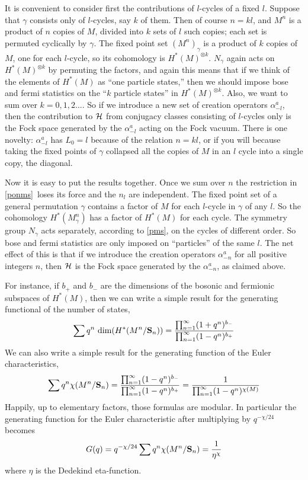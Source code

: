 \documentclass[12pt]{article}
\numberwithin{equation}{section}
\begin{document}
It is convenient to consider first the contributions of $l$-cycles
of a fixed $l$.  Suppose that $\gamma$ consists only of $l$-cycles,
say $k$ of them.  Then of course $n=kl$, and
$M^n$ is a product of $n$ copies of $M$, divided into $k$ sets
of $l$ such copies; each set is permuted cyclically by $\gamma$.
The fixed point set $(M^n)_\gamma$
is a product of $k$ copies of $M$, one for each $l$-cycle,  so its
cohomology is $H^*(M)^{\otimes k}$.  $N_\gamma$ again
acts on $H^*(M)^{\otimes k}$
by permuting the factors, and again this means that if we think of
the elements of $H^*(M)$ as ``one  particle states,'' then we should
impose bose and fermi statistics on the ``$k$ particle states''
in $H^*(M)^{\otimes k}$.  Also, we want to sum over $k=0,1,2\dots.$
So if we introduce a new set of creation
operators $\alpha^a_{-l}$, then the contribution to ${\cal H}$
from conjugacy classes consisting of $l$-cycles only is the Fock
space generated by the $\alpha^a_{-l}$ acting on the Fock vacuum.
There is one novelty: $\alpha^a_{-l}$ has $L_0=l$ because of the relation
$n=kl$, or if you will because taking the fixed points of $\gamma$
collapsed all the copies of $M$ in an $l$ cycle
into a single copy, the diagonal.

Now it is easy to put the results together. Once we sum over $n$
the restriction in \eqref{ponms}\ loses its force and the $n_l$ are independent.
The fixed point set of a general permutation $\gamma$ contains a factor
of $M$ for each $l$-cycle in $\gamma$ of any $l$.
So the cohomology $H^*(M^n_\gamma)$ has a factor of $H^*(M)$ for each
cycle.
The symmetry
group $N_\gamma$  acts separately, according to \eqref{pms}, on the cycles
of different order.  So bose and fermi statistics are only imposed
on ``particles'' of the same $l$.  The net effect of this is that
if we introduce the creation operators $\alpha^a_{-n}$ for all
positive integers $n$, then ${\cal H}$ is the Fock space generated
by the $\alpha^a_{-n}$, as claimed above.

For instance, if $b_+$ and $b_-$ are the dimensions of the bosonic
and fermionic subspaces of $H^*(M)$, then we can write a simple
result for the generating functional of the number of states,
%
\begin{equation}
  \label{gs}
  \sum q^n\ {\rm dim}(H^*(M^{n}/{\bf S}_n))={\prod_{n=1}^\infty
  (1+q^n)^{b_-} \over \prod_{n=1}^\infty(1-q^n)^{b_+}}
\end{equation}
We can also write a simple result for the generating function
of the Euler characteristics,
\begin{equation}
  \label{eul}
  \sum q^n \chi (M^{n}/{\bf S}_n) ={ \prod_{n=1}^\infty (1-q^n)^{b_-}
  \over \prod_{n=1}^\infty (1-q^n)^{b_+}}={1\over \prod_{n=1}^\infty
  (1-q^n)^{\chi(M)}}
\end{equation}
%
Happily, up to elementary factors, those formulas are modular.
In particular the generating function
for the Euler characteristic after multiplying by $q^{-\chi/24}$ becomes
%
\begin{equation}
  \label{eull}
  G(q)= q^{-\chi/24}\sum q^n \chi (M^{n}/{\bf S}_n)={1\over \eta^{\chi}}
\end{equation}
%
where $\eta $ is the Dedekind eta-function.
\end{document}
